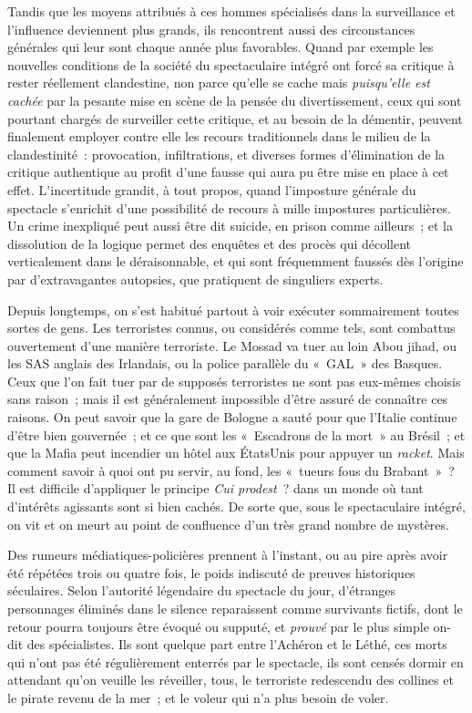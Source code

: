 \documentclass[french,twoside]{book} %
\begin{document}
Tandis que les moyens attribués à ces hommes spécialisés dans la surveillance et l’influence deviennent plus grands, ils rencontrent aussi des circonstances générales qui leur sont chaque année plus favorables. Quand par exemple les nouvelles conditions de la société du spectaculaire intégré ont forcé sa critique à rester réellement clandestine, non parce qu’elle se cache mais \emph{puisqu’elle est cachée} par la pesante mise en scène de la pensée du divertissement, ceux qui sont pourtant chargés de surveiller cette critique, et au besoin de la démentir, peuvent finalement employer contre elle les recours traditionnels dans le milieu de la clandestinité : provocation, infiltrations, et diverses formes d’élimination de la critique authentique au profit d’une fausse qui aura pu être mise en place à cet effet. L’incertitude grandit, à tout propos, quand l’imposture générale du spectacle s’enrichit d’une possibilité de recours à mille impostures particulières. Un crime inexpliqué peut aussi être dit suicide, en prison comme ailleurs ; et la dissolution de la logique permet des enquêtes et des procès qui décollent verticalement dans le déraisonnable, et qui sont fréquemment faussés dès l’origine par d’extravagantes autopsies, que pratiquent de singuliers experts.\par
Depuis longtemps, on s’est habitué partout à voir exécuter sommairement toutes sortes de gens. Les terroristes connus, ou considérés comme tels, sont combattus ouvertement d’une manière terroriste. Le Mossad va tuer au loin Abou jihad, ou les SAS anglais des Irlandais, ou la police parallèle du « GAL » des Basques. Ceux que l’on fait tuer par de supposés terroristes ne sont pas eux-mêmes choisis sans raison ; mais il est généralement impossible d’être assuré de connaître ces raisons. On peut savoir que la gare de Bologne a sauté pour que l’Italie continue d’être bien gouvernée ; et ce que sont les « Escadrons de la mort » au Brésil ; et que la Mafia peut incendier un hôtel aux ÉtatsUnis pour appuyer un \emph{racket}. Mais comment savoir à quoi ont pu servir, au fond, les « tueurs fous du Brabant » ? Il est difficile d’appliquer le principe \emph{Cui prodest} ? dans un monde où tant d’intérêts agissants sont si bien cachés. De sorte que, sous le spectaculaire intégré, on vit et on meurt au point de confluence d’un très grand nombre de mystères.\par
Des rumeurs médiatiques-policières prennent à l’instant, ou au pire après avoir été répétées trois ou quatre fois, le poids indiscuté de preuves historiques séculaires. Selon l’autorité légendaire du spectacle du jour, d’étranges personnages éliminés dans le silence reparaissent comme survivants fictifs, dont le retour pourra toujours être évoqué ou supputé, et \emph{prouvé} par le plus simple on-dit des spécialistes. Ils sont quelque part entre l’Achéron et le Léthé, ces morts qui n’ont pas été régulièrement enterrés par le spectacle, ils sont censés dormir en attendant qu’on veuille les réveiller, tous, le terroriste redescendu des collines et le pirate revenu de la mer ; et le voleur qui n’a plus besoin de voler.\par
\end{document}
